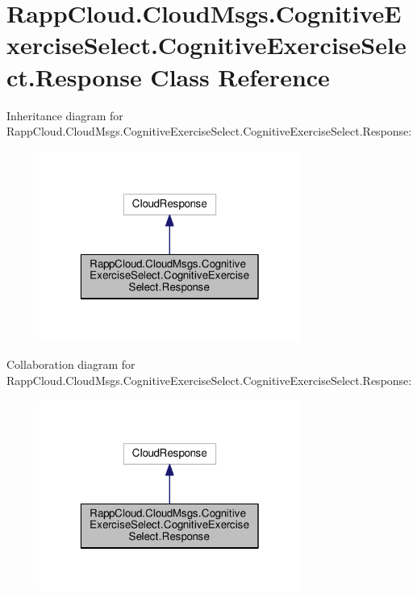 \hypertarget{classRappCloud_1_1CloudMsgs_1_1CognitiveExerciseSelect_1_1CognitiveExerciseSelect_1_1Response}{\section{Rapp\-Cloud.\-Cloud\-Msgs.\-Cognitive\-Exercise\-Select.\-Cognitive\-Exercise\-Select.\-Response Class Reference}
\label{classRappCloud_1_1CloudMsgs_1_1CognitiveExerciseSelect_1_1CognitiveExerciseSelect_1_1Response}
}


Inheritance diagram for Rapp\-Cloud.\-Cloud\-Msgs.\-Cognitive\-Exercise\-Select.\-Cognitive\-Exercise\-Select.\-Response\-:
\nopagebreak
\begin{figure}[H]
\begin{center}
\leavevmode
\includegraphics[width=244pt]{classRappCloud_1_1CloudMsgs_1_1CognitiveExerciseSelect_1_1CognitiveExerciseSelect_1_1Response__inherit__graph}
\end{center}
\end{figure}


Collaboration diagram for Rapp\-Cloud.\-Cloud\-Msgs.\-Cognitive\-Exercise\-Select.\-Cognitive\-Exercise\-Select.\-Response\-:
\nopagebreak
\begin{figure}[H]
\begin{center}
\leavevmode
\includegraphics[width=244pt]{classRappCloud_1_1CloudMsgs_1_1CognitiveExerciseSelect_1_1CognitiveExerciseSelect_1_1Response__coll__graph}
\end{center}
\end{figure}
